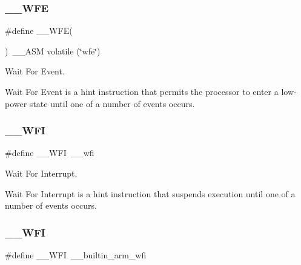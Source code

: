 \subsubsection{\texorpdfstring{\_\_WFE}{\_\_WFE}\hspace{0.1cm}{\footnotesize\ttfamily [4/4]}}
{\footnotesize\ttfamily \#define \+\_\+\+\_\+\+W\+FE(\begin{DoxyParamCaption}{ }\end{DoxyParamCaption})~\+\_\+\+\_\+\+A\+SM volatile (\char`\"{}wfe\char`\"{})}



Wait For Event. 

Wait For Event is a hint instruction that permits the processor to enter a low-\/power state until one of a number of events occurs. \mbox{\label{group___c_m_s_i_s___core___instruction_interface_gad23bf2b78a9a4524157c9de0d30b7448}} 
\subsubsection{\texorpdfstring{\_\_WFI}{\_\_WFI}\hspace{0.1cm}{\footnotesize\ttfamily [1/4]}}
{\footnotesize\ttfamily \#define \+\_\+\+\_\+\+W\+FI~\+\_\+\+\_\+wfi}



Wait For Interrupt. 

Wait For Interrupt is a hint instruction that suspends execution until one of a number of events occurs. \mbox{\label{group___c_m_s_i_s___core___instruction_interface_gad23bf2b78a9a4524157c9de0d30b7448}} 
\subsubsection{\texorpdfstring{\_\_WFI}{\_\_WFI}\hspace{0.1cm}{\footnotesize\ttfamily [2/4]}}
{\footnotesize\ttfamily \#define \+\_\+\+\_\+\+W\+FI~\+\_\+\+\_\+builtin\+\_\+arm\+\_\+wfi}




